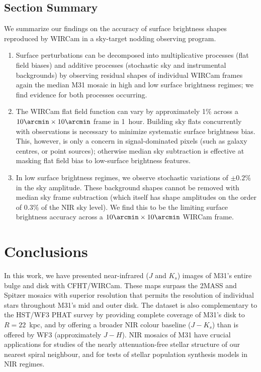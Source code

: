\documentclass[iop]{emulateapj}
\begin{document}
\subsection{Section Summary}
\label{sec:shapeconclusions}

We summarize our findings on the accuracy of surface brightness shapes reproduced by WIRCam in a sky-target nodding observing program.

\begin{enumerate}
  \item Surface perturbations can be decomposed into multiplicative processes (flat field biases) and additive processes (stochastic sky and instrumental backgrounds) by observing residual shapes of individual WIRCam frames again the median M31 mosaic in high and low surface brightness regimes; we find evidence for both processes occurring.
  \item The WIRCam flat field function can vary by approximately 1\% across a $10\arcmin \times 10\arcmin$ frame in 1~hour. Building sky flats concurrently with observations is necessary to minimize systematic surface brightness bias. This, however, is only a concern in signal-dominated pixels (such as galaxy centres, or point sources); otherwise median sky subtraction is effective at masking flat field bias to low-surface brightness features.
  \item In low surface brightness regimes, we observe stochastic variations of $\pm 0.2$\% in the sky amplitude. These background shapes cannot be removed with median sky frame subtraction (which itself has shape amplitudes on the order of $0.3\%$ of the NIR sky level). We find this to be the limiting surface brightness accuracy across a $10\arcmin \times 10\arcmin$ WIRCam frame.
\end{enumerate}

\section{Conclusions}
\label{sec:conclusions}

In this work, we have presented near-infrared ($J$ and $K_s$) images of M31's entire bulge and disk with CFHT/WIRCam.
These maps surpass the 2MASS \citep{Beaton:2007} and Spitzer \citep{Barmby:2006} mosaics with superior resolution that permits the resolution of individual stars throughout M31's mid and outer disk.
The dataset is also complementary to the HST/WF3 PHAT survey \citep{Dalcanton:2012} by providing complete coverage of M31's disk to $R=22$~kpc, and by offering a broader NIR colour baseline ($J-K_s$) than is offered by WF3 (approximately $J-H$).
NIR mosaics of M31 have crucial applications for studies of the nearly attenuation-free stellar structure of our nearest spiral neighbour, and for tests of stellar population synthesis models in NIR regimes.
\end{document}
